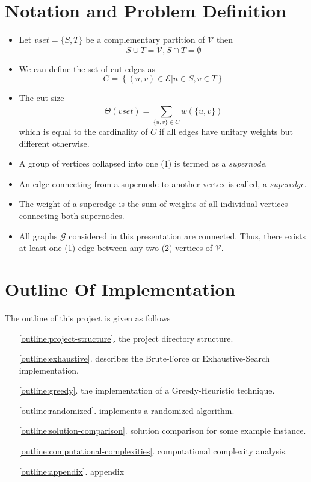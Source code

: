 \documentclass[longpaper, english, final, times]{revdetua}
\begin{document}
	\section{Notation and Problem Definition}
		\begin{itemize}
			
			\item Let  $vset=\{S, T\}	$ be a complementary partition of $\mathcal{V}$ then
					\[
						S\cup T = \mathcal{V} , S\cap T=\emptyset
					\]
			\item We can define the set of cut edges as
				\[
					C=\left\{(u,v) \in \mathcal{E} | u \in S, v \in T \right\}
				\]
			\item The cut size 
				\[
					\Theta(vset) = \sum_{\{u,v\}\in C}^{} w(\{u,v\})
				\]
				which is equal to the cardinality of $C$ if all edges have unitary weights but different otherwise.
			\item A group of vertices collapsed into one (1) is termed as a \textit{supernode}.
			\item An edge connecting from a supernode to another vertex is called, a \textit{superedge}.
			\item The weight of a superedge is the sum of weights of all individual vertices connecting both supernodes. 
			\item All graphs $\mathcal{G}$ considered in this presentation are connected. Thus, there exists at least one (1) edge between any two (2) vertices of $\mathcal{V}$. 
		\end{itemize}
	
	\section{Outline Of Implementation}
		The outline of this project is given as follows
		\begin{enumerate}[label=(\arabic*)]
			\item[\ref{outline:project-structure}.] the project directory structure. 
			\item[\ref{outline:exhaustive}.] describes the Brute-Force or Exhaustive-Search implementation.
			\item[\ref{outline:greedy}.] the implementation of a Greedy-Heuristic technique.
			\item[\ref{outline:randomized}.] implements a randomized algorithm.
			\item[\ref{outline:solution-comparison}.] solution comparison for some example instance.
			\item[\ref{outline:computational-complexities}.] computational complexity analysis.
			\item[\ref{outline:appendix}.] appendix 
		\end{enumerate}
	
\end{document}
